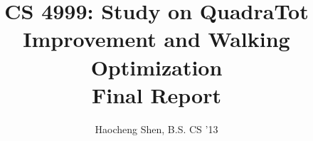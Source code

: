 \documentclass[11pt,letterpaper]{article}
\title{CS 4999: Study on QuadraTot Improvement and Walking Optimization\\
{\normalsize \sc Final Report}}
\author{Haocheng Shen, B.S. CS '13\\
\code{\{hs454\}@cornell.edu}}
\begin{document}
\maketitle
\normalem

\begin{abstract}

\end{abstract}







\end{document}
